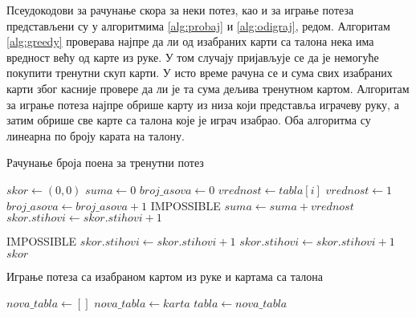 \documentclass[a4paper, 12pt, ngerman]{article}
\begin{document}
Псеудокодови за рачунање скора за неки потез, као и за играње потеза представљени су у алгоритмима \ref{alg:probaj} и \ref{alg:odigraj}, редом. Алгоритам \ref{alg:greedy} проверава најпре да ли од изабраних карти са талона нека има вредност већу од карте из руке. У том случају пријављује се да је немогуће покупити тренутни скуп карти. У исто време рачуна се и сума свих изабраних карти због касније провере да ли је та сума дељива тренутном картом. Алгоритам за играње потеза најпре обрише карту из низа који представља играчеву руку, а затим обрише све карте са талона које је играч изабрао. Оба алгоритма су линеарна по броју карата на талону.


\begin{algorithm}[htbp]
\caption{Рачунање броја поена за тренутни потез}
\label{alg:probaj}
\begin{algorithmic}

	\State $skor \gets (0, 0)$ 
	\State $suma \gets 0$
	\State $broj\_asova \gets 0$
			\Continue
		\EndIf
		\State $vrednost \gets tabla[i]$
				\State $vrednost \gets 1$
			\EndIf
			\State $broj\_asova \gets broj\_asova + 1$
		\EndIf
			\State\Return IMPOSSIBLE
		\EndIf
		\State $suma \gets suma + vrednost$
			\State $skor.stihovi \gets skor.stihovi + 1$
		\EndIf
	\EndFor
	
		\State\Return IMPOSSIBLE
	\EndIf
		\State $skor.stihovi \gets skor.stihovi + 1$
	\EndIf
		\State $skor.stihovi \gets skor.stihovi + 1$
	\EndIf
	\State\Return $skor$
	\EndFunction
\end{algorithmic}
\end{algorithm}

\begin{algorithm}[htbp]
\caption{Играње потеза са изабраном картом из руке и картама са талона}
\label{alg:odigraj}
\begin{algorithmic}
\State{}
\State $nova\_tabla \gets []$
		\State{}
	\EndIf
		\State $nova\_tabla \gets karta$
	\EndIf
	\EndFor
	\State $tabla \gets nova\_tabla$
\EndFunction
\end{algorithmic}
\end{algorithm}
\end{document}
